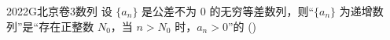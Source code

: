 
\begin{problem}{2022}{G}{北京卷}{3}{数列}
设 $\{a_n\}$ 是公差不为 0 的无穷等差数列，则“$\{a_n\}$ 为递增数列”是“存在正整数 $N_0$，当 $n > N_0$ 时，$a_n > 0$”的
(\hspace{1cm})
\begin{choices}
\end{choices}
\end{problem}